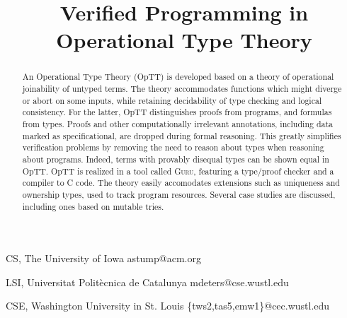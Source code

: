 \documentclass[preprint,natbib]{sigplanconf}
\begin{document}
\copyrightdata{\ } 

\titlebanner{\ }        %
\preprintfooter{\ }   %



\title{Verified Programming in Operational Type Theory}

{CS, The University of Iowa}
{astump@acm.org}

{LSI, Universitat Polit\`{e}cnica de Catalunya }
{mdeters@cse.wustl.edu}

{CSE, Washington University in St. Louis}
{\{tws2,tas5,emw1\}@cec.wustl.edu}



\maketitle


\begin{abstract}
An Operational Type Theory (OpTT) is developed based on a
theory of operational joinability of untyped terms.  The theory
accommodates functions which might diverge or abort on some inputs,
while retaining decidability of type checking and logical consistency.
For the latter, OpTT distinguishes proofs from programs, and formulas
from types.  Proofs and other computationally irrelevant annotations,
including data marked as specificational, are dropped during formal
reasoning.  This greatly simplifies verification problems by removing
the need to reason about types when reasoning about programs.  Indeed,
terms with provably disequal types can be shown equal in
OpTT.  OpTT is realized in a tool called
\textsc{Guru}, featuring a type/proof checker and a compiler to C
code.  The theory easily accomodates extensions such as uniqueness and
ownership types, used to track program resources.  Several case
studies are discussed, including ones based on mutable tries.
\end{abstract}
\end{document}
